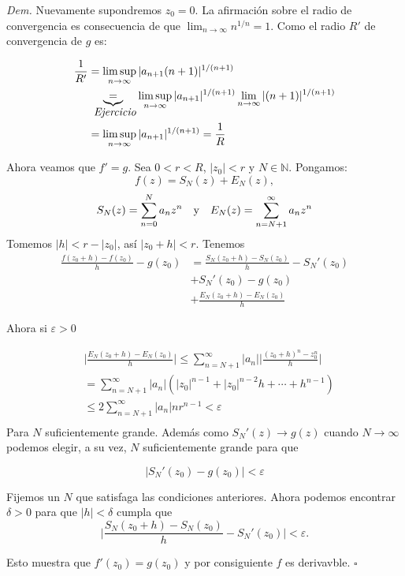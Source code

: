 \documentclass{article}
\newenvironment{demo}{\noindent\emph{Dem.}}{$\square$ \newline\vspace{5pt}}
\renewcommand{\epsilon}{\varepsilon}
\begin{document}
\begin{demo} Nuevamente supondremos $z_0=0$. La afirmación sobre el radio de convergencia es consecuencia de que $\lim_{n\to\infty}n^{1/n}=1$. Como el radio $R'$ de convergencia de $g$ es:

\[
\begin{split}
\frac{1}{R'}&=\limsup_{n\to\infty}|a_{n+1}(n+1)|^{1/(n+1)}\\
&\underbrace{=}_{\hbox{\emph{ Ejercicio}}}\limsup_{n\to\infty}|a_{n+1}|^{1/(n+1)}\lim_{n\to\infty}|(n+1)|^{1/(n+1)}\\
&=\limsup_{n\to\infty}|a_{n+1}|^{1/(n+1)}=\frac{1}{R}
\end{split}\]

Ahora veamos que  $f'=g$.   Sea $0<r<R$, $|z_0|<r$ y $N\in\mathbb{N}$. Pongamos:
\[f(z)=S_N(z)+E_N(z),\]
\[S_N(z)=\sum_{n=0}^{N}a_nz^n\quad\hbox{y}\quad E_N(z)=\sum_{n=N+1}^{\infty}a_nz^n\]
Tomemos $|h|<r-|z_0|$, así $|z_0+h|<r$.  Tenemos
\[\begin{split}
\frac{f(z_0+h)-f(z_0)}{h}-g(z_0)&= \frac{S_N(z_0+h)-S_N(z_0)}{h}-S_N'(z_0)\\
				&+S_N'(z_0)-g(z_0)\\
				&+\frac{E_N(z_0+h)-E_N(z_0)}{h}
\end{split}\]

Ahora si $\epsilon>0$

\[\begin{split}
				&\bigg|\frac{E_N(z_0+h)-E_N(z_0)}{h}\bigg|\leq\sum_{n=N+1}^{\infty}|a_n|\bigg|\frac{(z_0+h)^n-z_0^n}{h}\bigg|\\
				&=\sum_{n=N+1}^{\infty}|a_n|(|z_0|^{n-1}+|z_0|^{n-2}h+\cdots+h^{n-1})\\
				&\leq2\sum_{n=N+1}^{\infty}|a_n|nr^{n-1}<\epsilon\\
\end{split}\]
Para $N$ suficientemente grande. Además como $S_N'(z)\to g(z)$ cuando $N\to\infty$ podemos elegir, a su vez, $N$ suficientemente grande para que

\[
	|S_N'(z_0)-g(z_0)|<\epsilon
\]

 Fijemos un $N$ que satisfaga las condiciones anteriores. Ahora podemos encontrar $\delta>0$ para que $|h|<\delta$ cumpla que 
\[
\bigg|\frac{S_N(z_0+h)-S_N(z_0)}{h}-S_N'(z_0)\bigg|<\epsilon.
\]

Esto muestra que $f'(z_0)=g(z_0)$ y por consiguiente $f$ es derivavble.  
\end{demo}


 
\end{document}
